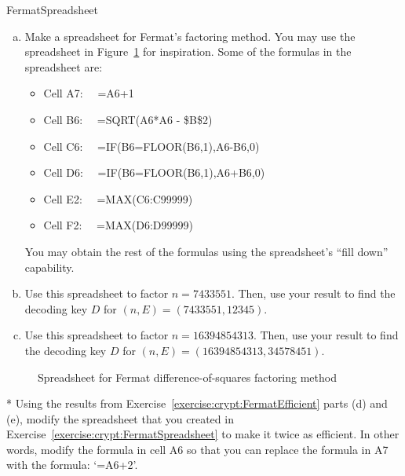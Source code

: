 \begin{exercise}{FermatSpreadsheet}
\begin{enumerate}[(a)]
\item
Make a spreadsheet for Fermat's factoring method. You may use the spreadsheet in Figure~\ref{fig:FermaFact} for inspiration. Some of the formulas in the spreadsheet are:
\begin{itemize}
\item
Cell A7: ~~=A6+1
\item
Cell B6:  ~~=SQRT(A6*A6 - \$B\$2)
\item
Cell C6:  ~~=IF(B6=FLOOR(B6,1),A6-B6,0)
\item
Cell D6:  ~~=IF(B6=FLOOR(B6,1),A6+B6,0)
\item
Cell E2: ~~=MAX(C6:C99999)
\item
Cell F2: ~~=MAX(D6:D99999)
\end{itemize}
You may obtain the rest of the formulas using the spreadsheet's ``fill down'' capability.
\item
Use this spreadsheet to factor $n=7433551$. Then, use your result to find the decoding key $D$ for $(n,E) = (7433551,12345)$.
\item
Use this spreadsheet to factor $n=16394854313$. Then, use your result to find the decoding key $D$ for $(n,E) = (16394854313,34578451)$. 
\end{enumerate}
\end{exercise}


\begin{figure}[h]
\caption{Spreadsheet for Fermat difference-of-squares factoring method}
\label{fig:FermaFact}
\end{figure}

\begin{exercise}{}
* Using the results from Exercise~\ref{exercise:crypt:FermatEfficient} parts (d) and (e), modify the spreadsheet that you created in Exercise~\ref{exercise:crypt:FermatSpreadsheet} to make it twice as efficient.  In other words, modify the formula in cell A6 so that you can replace the formula in A7 with the formula: `=A6+2'.
\end{exercise}

